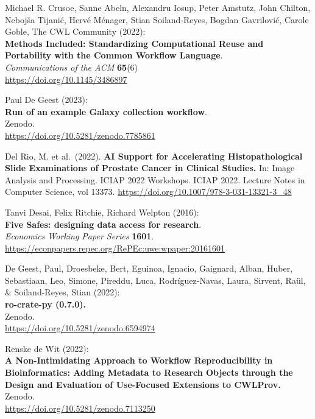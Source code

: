 \documentclass[10pt,letterpaper]{article}
\begin{document}
\begin{thebibliography}{10}
 Michael R. Crusoe, Sanne Abeln, Alexandru Iosup, Peter
Amstutz, John Chilton, Nebojša Tijanić, Hervé Ménager, Stian
Soiland-Reyes, Bogdan Gavrilović, Carole Goble, The CWL Community
(2022):\\
\textbf{Methods Included: Standardizing Computational Reuse and
Portability with the Common Workflow Language}.\\
\emph{Communications of the ACM} \textbf{65}(6)\\
\url{https://doi.org/10.1145/3486897}

 Paul De Geest (2023):\\
\textbf{Run of an example Galaxy collection workflow}.\\
Zenodo.\\
\url{https://doi.org/10.5281/zenodo.7785861}

 Del Rio, M. et al.~(2022). \textbf{AI Support for
Accelerating Histopathological Slide Examinations of Prostate Cancer in
Clinical Studies.} In: Image Analysis and Processing. ICIAP 2022
Workshops. ICIAP 2022. Lecture Notes in Computer Science, vol 13373.
\url{https://doi.org/10.1007/978-3-031-13321-3_48}

 Tanvi Desai, Felix Ritchie, Richard Welpton (2016):\\
\textbf{Five Safes: designing data access for research}.\\
\emph{Economics Working Paper Series} \textbf{1601}.\\
\url{https://econpapers.repec.org/RePEc:uwe:wpaper:20161601}

 De Geest, Paul, Droesbeke, Bert, Eguinoa, Ignacio,
Gaignard, Alban, Huber, Sebastiaan, Leo, Simone, Pireddu, Luca,
Rodríguez-Navas, Laura, Sirvent, Raül, \& Soiland-Reyes, Stian (2022):\\
\textbf{ro-crate-py (0.7.0).}\\
Zenodo.\\
\url{https://doi.org/10.5281/zenodo.6594974}

 Renske de Wit (2022):\\
\textbf{A Non-Intimidating Approach to Workflow Reproducibility in
Bioinformatics: Adding Metadata to Research Objects through the Design
and Evaluation of Use-Focused Extensions to CWLProv.}\\
Zenodo.\\
\url{https://doi.org/10.5281/zenodo.7113250}


\end{thebibliography}
\end{document}
